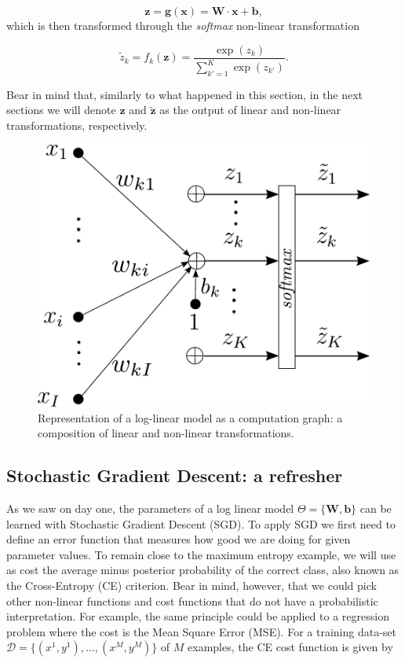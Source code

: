 \begin{equation}
\mathbf{z} = \mathbf{g}(\mathbf{x}) = \mathbf{W} \cdot \mathbf{x} + \mathbf{b},
\label{eq:linear}
\end{equation}
%
which is then transformed through the \textit{softmax} non-linear
transformation

\begin{equation}
\tilde{z}_k = f_k(\mathbf{z}) = \frac{\exp(z_k)}{\sum_{k'=1}^{K} \exp(z_{k'})}.
\label{eq:softmax}
\end{equation}

Bear in mind that, similarly to what happened in this section, in the next sections we will denote $\mathbf{z}$ and
$\tilde{\mathbf{z}}$ as the output of linear and non-linear
transformations, respectively.

\begin{figure}
\centering
\includegraphics[scale=0.5]{figs/deep_learning/LayerP_mla.pdf}
\caption{Representation of a log-linear model as a computation graph: a
composition of linear and non-linear transformations.}
\label{fig:LayerP}
\end{figure}

\subsection{Stochastic Gradient Descent: a refresher}

As we saw on day one, the parameters of a log linear model
$\Theta=\{\mathbf{W}, \mathbf{b}\}$ can be learned with Stochastic Gradient Descent (SGD). To apply SGD we first need to define an error function that measures how
good we are doing for given parameter values. %
 To remain close to the maximum
entropy example, we will use as cost the average minus posterior probability of
the correct class, also known as the Cross-Entropy (CE) criterion. Bear in
mind, however, that we could pick other non-linear functions and cost functions
that do not have
a probabilistic interpretation. For example, the same principle could be applied to
a regression problem where the cost is the Mean Square Error (MSE).
%
For a training data-set $\mathcal{D} = \{(x^1,y^1), \ldots, (x^M,y^M)\}$ of $M$ examples, the CE cost function is given by

